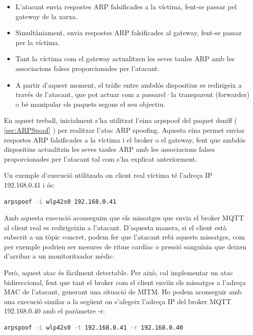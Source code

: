 \begin{itemize}
    \item L’atacant envia respostes ARP falsificades a la víctima, fent-se passar pel gateway de la xarxa.
    \item Simultàniament, envia respostes ARP falsificades al gateway, fent-se passar per la víctima.
    \item Tant la víctima com el gateway actualitzen les seves taules ARP amb les associacions falses proporcionades per l’atacant.
    \item A partir d’aquest moment, el tràfic entre ambdós dispositius es redirigeix a través de l’atacant, que pot actuar com a passarel·la transparent (forwarder) o bé manipular els paquets segons el seu objectiu.
\end{itemize}

En aquest treball, inicialment s'ha utilitzat l'eina arpspoof del paquet dsniff ( \ref{sec:ARPSpoof} ) per realitzar l'atac ARP spoofing. Aquesta eina permet enviar respostes ARP falsificades a la víctima i el broker o el gateway, fent que ambdós dispositius actualitzin les seves taules ARP amb les associacions falses proporcionades per l'atacant tal com s'ha explicat anteriorment.

Un exemple d'execució utilitzada on client real víctima té l'adreça IP 192.168.0.41 i és:

\begin{lstlisting}[language=bash, caption={Execució Arpspoof}, label=lst:arpspoof]
    arpspoof -i wlp42s0 192.168.0.41
\end{lstlisting}

Amb aquesta execució aconseguim que els missatges que envia el broker MQTT al client real es redirigeixin a l'atacant. D'aquesta manera, si el client està subscrit a un tòpic concret, podem fer que l'atacant rebi aquests missatges, com per exemple podrien ser mesures de ritme cardíac o pressió sanguínia que deixen d'arribar a un monitoritzador mèdic. 

Però, aquest atac és fàcilment detectable. Per això, cal implementar un atac bidireccional, fent que tant el broker com el client enviïn els missatges a l'adreça MAC de l'atacant, generant una situació de MITM. Ho podem aconseguir amb una execució similar a la següent on s'afegeix l'adreça IP del broker MQTT 192.168.0.40 amb el paràmetre -r:

\begin{lstlisting}[language=bash, caption={Execució Arpspoof bidireccional}, label=lst:arpspoof_bidireccional]
    arpspoof -i wlp42s0 -t 192.168.0.41 -r 192.168.0.40
\end{lstlisting}

